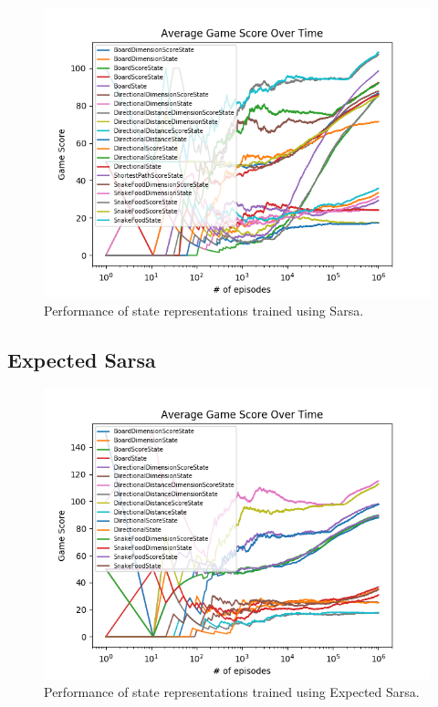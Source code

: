 \documentclass[result.tex]{subfiles}
\begin{document}
    \begin{figure}[ht]
        \centering
        \includegraphics[width=\linewidth]{../images/sarsa/state/234/all_average_game_score_over_time.png}
        \caption{Performance of state representations trained using Sarsa.}
        \label{fig:app_state_sarsa}
    \end{figure}

    \newpage

    \subsection*{Expected Sarsa}

    \begin{figure}[ht]
        \centering
        \includegraphics[width=\linewidth]{../images/expected_sarsa/state/234/all_average_game_score_over_time.png}
        \caption{Performance of state representations trained using Expected Sarsa.}
        \label{fig:app_state_expected_sarsa}
    \end{figure}
\end{document}
